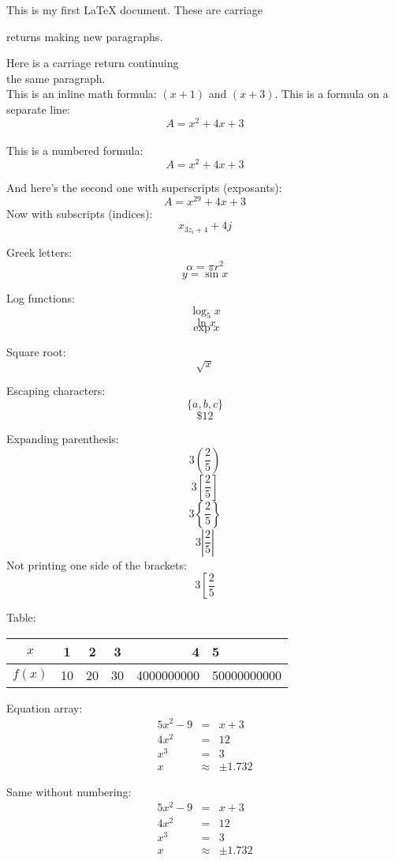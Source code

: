 \documentclass[a4paper,11pt]{article}
\begin{document}
This is my first LaTeX document.
These are carriage

returns making new paragraphs.

Here is a carriage return continuing \\the same paragraph.\\

 
This is an inline math formula: $(x+1)$ and $(x+3)$.
This is a formula on a separate line:
$$A=x^2+4x+3$$ \\

This is a numbered formula:
\begin{equation}
A=x^2+4x+3
\end{equation} 

And here's the second one with superscripts (exposants):
\begin{equation}
A=x^{29}+4x+3
\end{equation} 
Now with subscripts (indices):
\begin{equation}
x_{3z_i+4}+4j
\end{equation}

Greek letters:
$$\alpha=\pi r^2$$
$$y=\sin{x}$$

Log functions:
$$\log_5{x}$$
$$\ln{x}$$
$$\exp{x}$$

Square root:
$$\sqrt{x}$$

Escaping characters:
$$\{a,b,c\}$$
$$\$12$$

Expanding parenthesis:
$$3\left(\frac{2}{5}\right)$$
$$3\left[\frac{2}{5}\right]$$
$$3\left\{\frac{2}{5}\right\}$$
$$3\left|\frac{2}{5}\right|$$
Not printing one side of the brackets:
$$3\left[\frac{2}{5}\right.$$

Table:
\begin{tabular}{c|cccrl}
\hline
$x$ & 1 & 2 & 3 & 4 & 5 \\ \hline
$f(x)$ & 10 & 20 \vline & 30 & 4000000000 & 50000000000 \\ \hline
\end{tabular}

Equation array:
\begin{eqnarray}
5x^2-9&=&x+3 \\
4x^2&=&12 \\
x^3&=&3 \\
x&\approx&\pm1.732 
\end{eqnarray}

Same without numbering:
\begin{eqnarray*}
5x^2-9&=&x+3 \\
4x^2&=&12 \\
x^3&=&3 \\
x&\approx&\pm1.732 
\end{eqnarray*}
\end{document}
